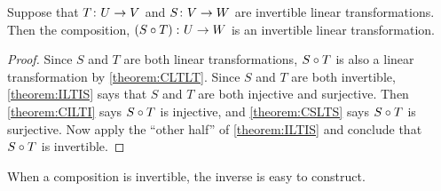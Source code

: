 \documentclass{ximera}
\begin{document}
\begin{theorem}
\label{theorem:CIVLT}


Suppose that $T\colon U\rightarrow V$ and $S\colon V\rightarrow W$ are invertible linear transformations.  Then the composition, $\left({S}\circ{T}\right)\colon U\rightarrow W$ is an invertible linear transformation.





\begin{proof}
Since $S$ and $T$ are both linear transformations,  ${S}\circ{T}$ is also a linear transformation by \ref{theorem:CLTLT}.    Since $S$ and $T$ are both invertible, \ref{theorem:ILTIS} says that $S$ and $T$ are both injective and surjective.  Then \ref{theorem:CILTI} says ${S}\circ{T}$ is injective, and \ref{theorem:CSLTS} says ${S}\circ{T}$ is surjective.  Now apply the ``other half'' of \ref{theorem:ILTIS} and conclude that ${S}\circ{T}$ is invertible.



\end{proof}
\end{theorem}

When a composition is invertible, the inverse is easy to construct.
\end{document}
